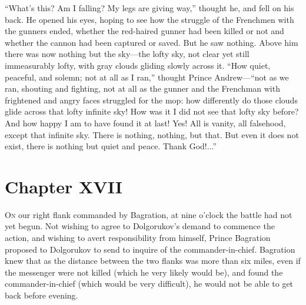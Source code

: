 ``What's this? Am I falling? My legs are giving way,'' thought
he, and fell on his back. He opened his eyes, hoping to see how
the struggle of the Frenchmen with the gunners ended, whether the
red-haired gunner had been killed or not and whether the cannon
had been captured or saved.  But he saw nothing. Above him there
was now nothing but the sky---the lofty sky, not clear yet still
immeasurably lofty, with gray clouds gliding slowly across
it. ``How quiet, peaceful, and solemn; not at all as I ran,''
thought Prince Andrew---``not as we ran, shouting and fighting,
not at all as the gunner and the Frenchman with frightened and
angry faces struggled for the mop: how differently do those
clouds glide across that lofty infinite sky! How was it I did not
see that lofty sky before? And how happy I am to have found it at
last! Yes! All is vanity, all falsehood, except that infinite
sky. There is nothing, nothing, but that. But even it does not
exist, there is nothing but quiet and peace.  Thank God!...''


\chapter*{Chapter XVII}
\ifaudio     
{} 
\fi

\lettrine[lines=2, loversize=0.3, lraise=0]{\initfamily O}{n}
our right flank commanded by Bagration, at nine o'clock the
battle had not yet begun. Not wishing to agree to Dolgorukov's
demand to commence the action, and wishing to avert
responsibility from himself, Prince Bagration proposed to
Dolgorukov to send to inquire of the
commander-in-chief. Bagration knew that as the distance between
the two flanks was more than six miles, even if the messenger
were not killed (which he very likely would be), and found the
commander-in-chief (which would be very difficult), he would not
be able to get back before evening.

